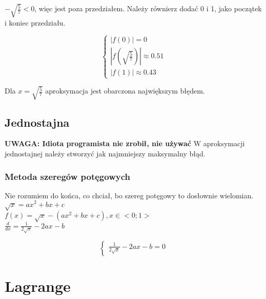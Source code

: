 \documentclass{article}
\begin{document}
$-\sqrt{\frac{5}{7}}<0$, więc jest poza przedziałem. Należy równierz dodać 0 i 1, jako początek i koniec przedziału.

\begin{equation*}\begin{cases}
    |f(0)| = 0\\
    |f(\sqrt{\frac{5}{7}})| \approx 0.51\\
    |f(1)| \approx 0.43
\end{cases}\end{equation*}

Dla $x=\sqrt{\frac{5}{7}}$ aproksymacja jest obarczona największym błędem.

\subsection{Jednostajna}
\textbf{UWAGA: Idiota programista nie zrobił, nie używać}
W aproksymacji jednostajnej należy stworzyć jak najmniejszy maksymalny błąd.\\
\subsubsection{Metoda szeregów potęgowych}
Nie rozumiem do końca, co chciał, bo szereg potęgowy to dosłownie wielomian.\\
$\sqrt{x}=ax^2+bx+c$\\
$f(x)=\sqrt{x}-(ax^2+bx+c), x\in<0;1>$\\
$\frac{d}{dx}=\frac{1}{2\sqrt{x}}-2ax-b$

\begin{equation*}\begin{cases}
    \frac{1}{2\sqrt{x}}-2ax-b=0
\end{cases}\end{equation*}


\section{Lagrange}
\end{document}
